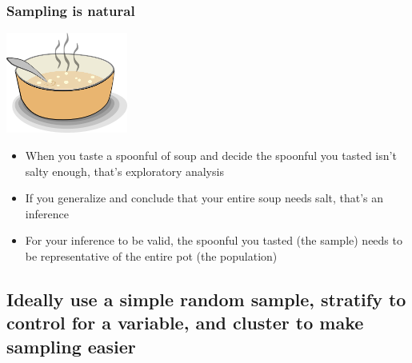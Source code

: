 \documentclass[11pt]{beamer}
\begin{document}
\begin{frame}
\frametitle{Sampling is natural}

\begin{center}
\includegraphics[width=0.3\textwidth]{figures/soup}
\end{center}

\begin{itemize}

\item When you taste a spoonful of soup and decide the spoonful you tasted isn't salty 
enough, that's \alert{exploratory analysis}

\item If you generalize and conclude that your entire soup needs salt, that's an \alert{
inference}

\item For your inference to be valid, the spoonful you tasted (the sample) needs to be 
\alert{representative} of the entire pot (the population)

\end{itemize}

\end{frame}


\subsection{Ideally use a simple random sample, stratify to control for a variable, and cluster to make sampling easier} 
\label{mi2}


\end{document}
